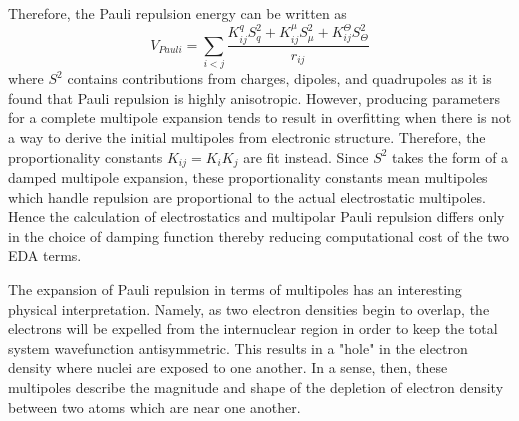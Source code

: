 \documentclass[journal=jctcce,manuscript=article]{achemso}
\begin{document}
Therefore, the Pauli repulsion energy can be written as
\begin{equation}
  V_{Pauli}=\sum_{i<j}\frac{K_{ij}^q S^2_{q}+K_{ij}^\mu S^2_{\mu}+K_{ij}^\Theta S^2_{\Theta}}{r_{ij}}
\label{eq:pauli}
\end{equation}
\noindent
where $S^2$ contains contributions from charges, dipoles, and quadrupoles as it is found that Pauli repulsion is highly anisotropic. However, producing parameters for a complete multipole expansion
tends to result in overfitting when there is not a way to derive the initial multipoles
from electronic structure. Therefore, the proportionality constants $K_{ij}=K_iK_j$ are fit instead. Since $S^2$ takes the form of a damped multipole expansion\cite{rackers2019classical}, these proportionality
constants mean multipoles which handle repulsion are proportional to the actual electrostatic
multipoles. Hence the calculation of electrostatics and
multipolar Pauli repulsion differs only in the choice of damping function thereby reducing computational cost
of the two EDA terms.

The expansion of Pauli repulsion in terms of multipoles has an interesting physical interpretation.
Namely, as two electron densities begin to overlap, the electrons will be expelled
from the internuclear region in order to keep the total system wavefunction antisymmetric.
This results in a "hole" in the electron density where nuclei are exposed to one another.
In a sense, then, these multipoles describe the magnitude and shape of the depletion of electron density between two atoms which are near one another. 
\end{document}
